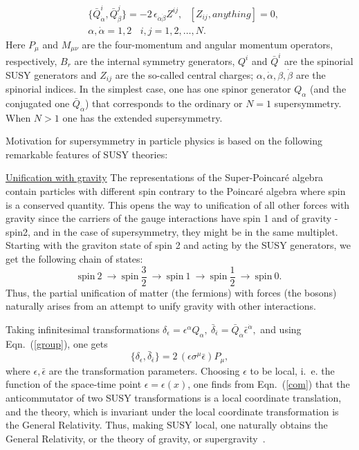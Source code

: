 \documentclass{cernyrep}
\begin{document}
 \begin{equation}
\begin{split} 
&\{ \bar Q_{\dot\alpha}^i, \bar Q_{\dot\beta}^j \} =
    - 2 \, \epsilon_{\dot\alpha \dot\beta} Z^{ij}, \ \ \ [Z_{ij}, anything] = 0, \\
&\alpha, \dot\alpha  =  1,2 \ \ \ \ i,j = 1,2, \ldots , N.
\end{split}
\label{group}
\end{equation}
Here $P_{\mu}$ and $M_{\mu \nu}$ are the four-momentum and
angular momentum operators, respectively, $B_r$ are the
internal symmetry generators, $Q^i$ and $\bar Q^i$ are the
spinorial SUSY generators and $Z_{ij}$ are the so-called
central charges; $\alpha, \dot\alpha, \beta, \dot\beta$ are the
spinorial indices. In the simplest case, one has one spinor
generator $Q_\alpha$ (and the conjugated one
$\bar Q_{\dot{\alpha}}$) that corresponds to the ordinary or
$N=1$ supersymmetry. When $N>1$ one has the extended
supersymmetry. 

Motivation for supersymmetry in particle physics is based  on the following remarkable features of SUSY theories:

\underline{Unification with gravity}
 The representations of the Super-Poincar\'e algebra
contain particles with different spin contrary to the Poincar\'e algebra where spin is a conserved quantity. This opens the way to unification of  all other forces with gravity since the carriers of the gauge interactions have spin 1 and  of gravity - spin2, and in the case of supersymmetry, they might be in the same multiplet. 
Starting with the graviton
state of  spin 2 and acting by the SUSY generators, we get the
following chain of states:
$$
\text{spin} \ 2 \ \rightarrow \
\text{spin} \ \frac 32 \ \rightarrow \
\text{spin} \ 1 \ \rightarrow \
\text{spin} \ \frac 12 \ \rightarrow \
\text{spin} \ 0.
$$
Thus, the partial unification of matter (the fermions) with
forces (the bosons) naturally arises from an attempt to unify
gravity with other interactions.

Taking infinitesimal transformations
$\delta_\epsilon = \epsilon^\alpha Q_\alpha, \
\bar{\delta}_{\bar \epsilon} =
\bar{Q}_{\dot \alpha}{\bar \epsilon}^{\dot \alpha},$
and using Eqn.~(\ref{group}), one gets
\begin{equation}
\{\delta_\epsilon,\bar{\delta}_{\bar \epsilon} \} =
2 \, (\epsilon \sigma^\mu \bar \epsilon )P_\mu ,
\label{com}
\end{equation}
where $\epsilon, \bar\epsilon$ are the transformation parameters.
Choosing $\epsilon$ to be local, i.~e. the function of the
space-time point $\epsilon = \epsilon(x)$, one finds from
Eqn.~(\ref{com}) that the anticommutator of two SUSY
transformations is a local coordinate translation, and the
theory, which is invariant under the local coordinate
transformation is the General Relativity. Thus, making SUSY
local, one naturally obtains the General Relativity, or the
theory of gravity, or supergravity~\cite{Rev}.
\end{document}
